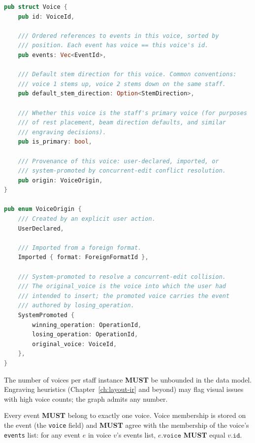 \documentclass[11pt,letterpaper]{report}
\newcounter{requirement}[chapter]
\newcommand{\MUST}{\textbf{MUST}}
\begin{document}
\begin{lstlisting}[language=Rust]
pub struct Voice {
    pub id: VoiceId,

    /// Ordered references to events in this voice, sorted by
    /// position. Each event has voice == this voice's id.
    pub events: Vec<EventId>,

    /// Default stem direction for this voice. Common conventions:
    /// voice 1 stems up, voice 2 stems down on the same staff.
    pub default_stem_direction: Option<StemDirection>,

    /// Whether this voice is the staff's primary voice (for purposes
    /// of rest placement, beam direction defaults, and similar
    /// engraving decisions).
    pub is_primary: bool,

    /// Provenance of this voice: user-declared, imported, or
    /// system-promoted by concurrent-edit conflict resolution.
    pub origin: VoiceOrigin,
}

pub enum VoiceOrigin {
    /// Created by an explicit user action.
    UserDeclared,

    /// Imported from a foreign format.
    Imported { format: ForeignFormatId },

    /// System-promoted to resolve a concurrent-edit collision.
    /// The original_voice is the voice into which the user had
    /// intended to insert; the promoted voice carries the event
    /// authored by losing_operation.
    SystemPromoted {
        winning_operation: OperationId,
        losing_operation: OperationId,
        original_voice: VoiceId,
    },
}
\end{lstlisting}

\begin{requirement}
  \label{req:graph:unbounded-voice-count}
  The number of voices per staff instance \MUST{} be unbounded in
  the data model. Engraving heuristics (Chapter~\ref{ch:layout-ir}
  and beyond) may flag visual issues with high voice counts; the
  graph admits any number.
\end{requirement}

\begin{requirement}
  \label{req:graph:event-voice-membership}
  Every event \MUST{} belong to exactly one voice. Voice membership
  is stored on the event (the \texttt{voice} field) and \MUST{} agree
  with the membership of the voice's \texttt{events} list:
  for any event $e$ in voice $v$'s events list, $e\texttt{.voice}$
  \MUST{} equal $v\texttt{.id}$.
\end{requirement}
\end{document}
